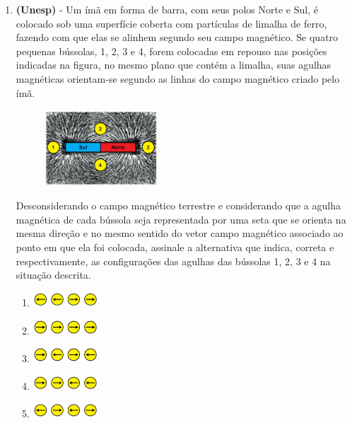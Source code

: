 \documentclass[12pt,letterpaper,fleqn]{article}
\begin{document}
\begin{itemize}
\begin{enumerate}
            \item \textbf{(Unesp)} - Um ímã em forma de barra, com seus polos Norte e Sul, é colocado sob uma superfície coberta com partículas de limalha de ferro, fazendo com que elas se alinhem segundo seu campo magnético. Se quatro pequenas bússolas, 1, 2, 3 e 4, forem colocadas em repouso nas posições indicadas na figura, no mesmo plano que contém a limalha, suas agulhas magnéticas orientam-se segundo as linhas do campo magnético criado pelo ímã.
            \begin{figure}[h]
                \centering
                \includegraphics[width = 0.4\textwidth]{ex_2_unesp.jpg}
            \end{figure}
            Desconsiderando o campo magnético terrestre e considerando que a agulha magnética de cada bússola seja representada por uma seta que se orienta na mesma direção e no mesmo sentido do vetor campo magnético associado ao ponto em que ela foi colocada, assinale a alternativa que indica, correta e respectivamente, as configurações das agulhas das bússolas 1, 2, 3 e 4 na situação descrita.
            \pagebreak
            
            \begin{enumerate}
                \item \includegraphics[width=0.2\textwidth]{letra-a.jpg} 
                \item \includegraphics[width=0.2\textwidth]{2-letra-b.jpg}
                \item \includegraphics[width=0.2\textwidth]{2-letra-c.jpg}
                \item \includegraphics[width=0.2\textwidth]{2-letra-d.jpg}
                \item \includegraphics[width=0.2\textwidth]{2-letra-e.jpg}
            \end{enumerate}
            

\end{enumerate}
\end{itemize}
\end{document}
